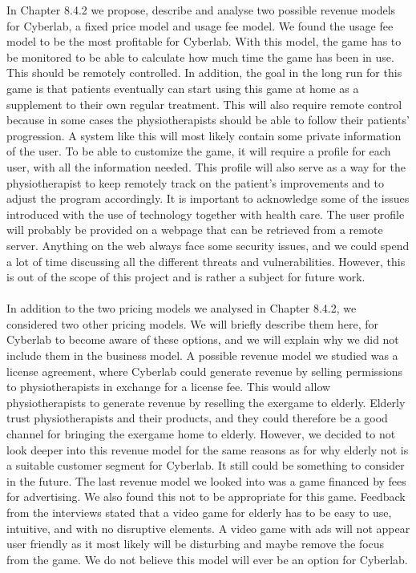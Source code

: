 In Chapter 8.4.2 we propose, describe and analyse two possible revenue models for Cyberlab, a fixed price model and usage fee model. We found the usage fee model to be the most profitable for Cyberlab. With this model, the game has to be monitored to be able to calculate how much time the game has been in use. This should be remotely controlled. In addition, the goal in the long run for this game is that patients eventually can start using this game at home as a supplement to their own regular treatment. This will also require remote control because in some cases the physiotherapists should be able to follow their patients’ progression. A system like this will most likely contain some private information of the user. To be able to customize the game, it will require a profile for each user, with all the information needed. This profile will also serve as a way for the physiotherapist to keep remotely track on the patient’s improvements and to adjust the program accordingly. It is important to acknowledge some of the issues introduced with the use of technology together with health care. The user profile will probably be provided on a webpage that can be retrieved from a remote server. Anything on the web always face some security issues, and we could spend a lot of time discussing all the different threats and vulnerabilities. However, this is out of the scope of this project and is rather a subject for future work. \\ \\ 
In addition to the two pricing models we analysed in Chapter 8.4.2, we considered two other pricing models. We will briefly describe them here, for Cyberlab to become aware of these options, and we will explain why we did not include them in the business model. A possible revenue model we studied was a license agreement, where Cyberlab could generate revenue by selling permissions to physiotherapists in exchange for a license fee. This would allow physiotherapists to generate revenue by reselling the exergame to elderly. Elderly trust physiotherapists and their products, and they could therefore be a good channel for bringing the exergame home to elderly. However, we decided to not look deeper into this revenue model for the same reasons as for why elderly not is a suitable customer segment for Cyberlab. It still could be something to consider in the future. The last revenue model we looked into was a game financed by fees for advertising. We also found this not to be appropriate for this game. Feedback from the interviews stated that a video game for elderly has to be easy to use, intuitive, and with no disruptive elements. A video game with ads will not appear user friendly as it most likely will be disturbing and maybe remove the focus from the game. We do not believe this model will ever be an option for Cyberlab. \\ \\
